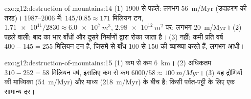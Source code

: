 \begin{solution}{exo:g12:destruction-of-mountains:14}
(1) 1900 से पहले: लगभग \qty{56}{m/Myr} (उदाहरण की तरह)।
1987--2006 में: $145/0.85 \approx 171$ मिलियन टन, $\num{1.71e11}/2830
\approx \qty{6.0e7}{m^3}$, $\qty{2.98e12}{m^2}$ पर: लगभग
\qty{20}{m/Myr}। (2) पहले वाली: बाद का भार बाँधों
और दूसरे निर्माणों द्वारा रोका जाता है। (3) नहीं: कमी प्रति वर्ष $400 - 145 = 255$ मिलियन टन
है, जिसमें से बाँध 100 से 150 की व्याख्या करते हैं, लगभग आधी।
\end{solution}

\begin{solution}{exo:g12:destruction-of-mountains:15}
(1) कम से कम \qty{6}{km}। (2) अधिकतम $310 - 252 = 58$ मिलियन वर्ष, इसलिए
कम से कम $6000/58 \approx \qty{100}{m/Myr}$। (3) यह द्रोणियों की माध्यिका
(\qty{54}{m/Myr}) और माध्य (\qty{218}{m/Myr}) के बीच है: किसी पर्वत-पट्टी के लिए
एक सामान्य दर।
\end{solution}

